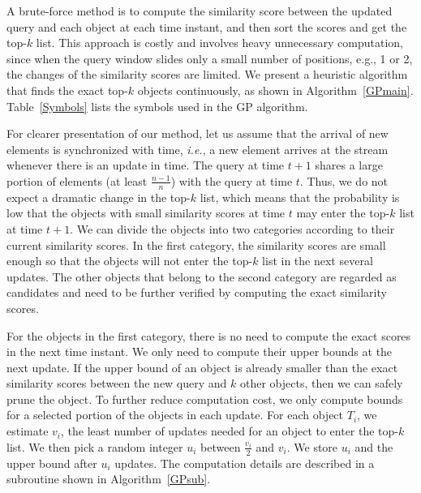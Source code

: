 A brute-force method is to compute the similarity score between the updated query and each object at each time instant, and then sort the scores and get the top-$k$ list. This approach is costly and involves heavy unnecessary computation, since when the query window slides only a small number of positions, e.g., 1 or 2, the changes of the similarity scores are limited. We present a heuristic algorithm that finds the exact top-$k$ objects continuously, as shown in Algorithm~\ref{GPmain}. Table~\ref{Symbols} lists the symbols used in the GP algorithm.

For clearer presentation of our method, let us assume that the arrival of new elements is synchronized with time, \emph{i.e.}, a new element arrives at the stream whenever there is an update in time. The query at time $t+1$ shares a large portion of elements (at least $\frac{n-1}{n}$) with the query at time $t$. Thus, we do not expect a dramatic change in the top-$k$ list, which means that the probability is low that the objects with small similarity scores at time $t$ may enter the top-$k$ list at time $t+1$. We can divide the objects into two categories according to their current similarity scores. In the first category, the similarity scores are small enough so that the objects will not enter the top-$k$ list in the next several updates. The other objects that belong to the second category are regarded as candidates and need to be further verified by computing the exact similarity scores.

For the objects in the first category, there is no need to compute the exact scores in the next time instant. We only need to compute their upper bounds at the next update. If the upper bound of an object is already smaller than the exact similarity scores between the new query and $k$ other objects, then we can safely prune the object. To further reduce computation cost, we only compute bounds for a selected portion of the objects in each update. For each object $T_i$, we estimate $v_i$, the least number of updates needed for an object to enter the top-$k$ list.  We then pick a random integer $u_i$ between $\frac{v_i}{2}$ and $v_i$. We store $u_i$ and the upper bound after $u_i$ updates.  The computation details are described in a subroutine shown in Algorithm~\ref{GPsub}.

